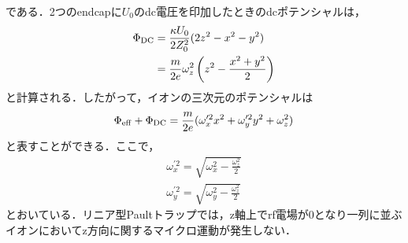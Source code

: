 である．2つのendcapに$U_0$のdc電圧を印加したときのdcポテンシャルは，
\large
\begin{align}
\Phi_{\rm DC} &= \frac{\kappa U_0}{2Z_0^2}(2z^2 - x^2 - y^2) \\
					&= \frac{m}{2e}\omega_z^2 \left(z^2 - \frac{x^2 + y^2}{2}\right)
\end{align}
\normalsize
と計算される．したがって，イオンの三次元のポテンシャルは
\large
\begin{align}\label{eq:3D_harmonic}
\Phi_{\rm eff} + \Phi_{\rm DC} = \frac{m}{2e}(\omega^{\prime 2}_{x} x^2 + \omega^{\prime 2}_{y} y^2 + \omega_z^2)
\end{align}
\normalsize
と表すことができる．ここで，
\large
\begin{align}
\omega^{\prime 2}_x = \sqrt{\omega_x^2 - \frac{\omega_z^2}{2}} \\
\omega^{\prime 2}_y = \sqrt{\omega_y^2 - \frac{\omega_z^2}{2}}
\end{align}
\normalsize
とおいている．リニア型Paultトラップでは，z軸上でrf電場が0となり一列に並ぶイオンにおいてz方向に関するマイクロ運動が発生しない．

